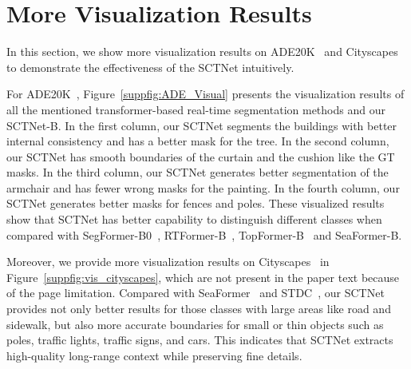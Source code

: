 \documentclass[letterpaper]{article} %
\begin{document}
\section{More Visualization Results}\label{section:E}
In this section, we show more visualization results on ADE20K~\cite{zhou2017scene} and Cityscapes~\cite{cordts2016cityscapes} to demonstrate the effectiveness of the SCTNet intuitively. 

For ADE20K~\cite{zhou2017scene}, Figure~\ref{suppfig:ADE_Visual} presents the visualization results of all the mentioned transformer-based real-time segmentation methods and our SCTNet-B. In the first column, our SCTNet segments the buildings with better internal consistency and has a better mask for the tree. In the second column, our SCTNet has smooth boundaries of the curtain and the cushion like the GT masks. In the third column, our SCTNet generates better segmentation of the armchair and has fewer wrong masks for the painting. In the fourth column, our SCTNet generates better masks for fences and poles. These visualized results show that SCTNet has better capability to distinguish different classes when compared with SegFormer-B0~\cite{xie2021segformer}, RTFormer-B~\cite{wang2022rtformer}, TopFormer-B~\cite{zhang2022topformer} and SeaFormer-B\cite{wan2023seaformer}.

Moreover, we provide more visualization results on Cityscapes~\cite{cordts2016cityscapes} in Figure~\ref{suppfig:vis_cityscapes}, which are not present in the paper text because of the page limitation. Compared with SeaFormer~\cite{wan2023seaformer} and STDC~\cite{fan2021rethinking}, our SCTNet provides not only better results for those classes with large areas like road and sidewalk, but also more accurate boundaries for small or thin objects such as poles, traffic lights, traffic signs, and cars. This indicates that SCTNet extracts high-quality long-range context while preserving fine details.
\end{document}

